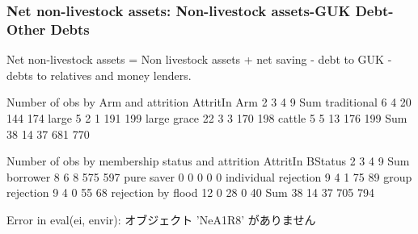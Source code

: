 

\subsubsection{Net non-livestock assets: Non-livestock assets-GUK Debt-Other Debts}

Net non-livestock assets = Non livestock assets + net saving - debt to GUK - debts to relatives and money lenders. 


\begin{Schunk}
\begin{Soutput}


Number of obs by Arm and attrition
             AttritIn
Arm             2   3   4   9 Sum
  traditional   6   4  20 144 174
  large         5   2   1 191 199
  large grace  22   3   3 170 198
  cattle        5   5  13 176 199
  Sum          38  14  37 681 770


Number of obs by membership status and attrition
                      AttritIn
BStatus                  2   3   4   9 Sum
  borrower               8   6   8 575 597
  pure saver             0   0   0   0   0
  individual rejection   9   4   1  75  89
  group rejection        9   4   0  55  68
  rejection by flood    12   0  28   0  40
  Sum                   38  14  37 705 794
\end{Soutput}
\begin{Soutput}
Error in eval(ei, envir):  オブジェクト 'NeA1R8' がありません 
\end{Soutput}
\end{Schunk}




